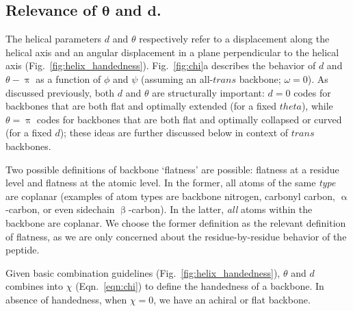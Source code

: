 \documentclass[fleqn,10pt]{wlpeerj} %
\newcommand{\Fig}[1]{Fig.~\ref{#1}}
\newcommand{\Eqn}[1]{Eqn.~\ref{#1}}
\newcommand\solidrule[1][1cm]{\rule[0.5ex]{#1}{0.2mm}}
\newcommand\dotdashedrule{\mbox{%
  \solidrule[1.5mm]\hspace{0.75mm}\solidrule[0.2mm]\hspace{0.75mm}\solidrule[1.5mm]}}
\newcommand\dashedrule{\mbox{%
  \solidrule[1.5mm]\hspace{0.75mm}\solidrule[1.5mm]}}
\newcommand{\figdir}{./figures}
\begin{document}
\subsection*{Relevance of $\bm \theta$ and $\bm d$.}
The helical parameters $d$ and $\theta$ respectively refer to a displacement along the helical axis and an angular displacement in a plane perpendicular to the helical axis (\Fig{fig:helix_handedness}).  \Fig{fig:chi}a describes the behavior of $d$ and $\theta-\uppi$ as a function of $\phi$ and $\psi$ (assuming an all-$trans$ backbone; $\omega=0$). 
As discussed previously, both $d$ and $\theta$ are structurally important: $d=0$ codes for backbones that are both flat and optimally extended (for a fixed $theta$), while $\theta=\uppi$ codes for backbones that are both flat and optimally collapsed or curved (for a fixed $d$); these ideas are further discussed below in context of $trans$ backbones. 

Two possible definitions of backbone `flatness' are possible: flatness at a residue level and flatness at the atomic level. In the former, all atoms of the same {\em type} are coplanar (examples of atom types are backbone nitrogen, carbonyl carbon, $\upalpha$-carbon, or even sidechain $\upbeta$-carbon). In the latter, {\em all} atoms within the backbone are coplanar. We choose the former definition as the relevant definition of flatness, as we are only concerned about the residue-by-residue behavior of the peptide. 

Given basic combination guidelines (\Fig{fig:helix_handedness}), $\theta$ and $d$ combines into $\chi$ (\Eqn{eqn:chi}) to define the handedness of a backbone. In absence of handedness, when $\chi=0$, we have an achiral or flat backbone. 

\begin{figure}[t!]
\end{figure}
\end{document}
